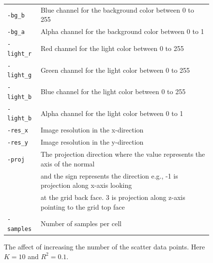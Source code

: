 \documentclass[12pt]{article}
\begin{document}
\begin{figure}[tbh]
\begin{tabular}{ |l| l|}
  \texttt{-bg\_b}  &      Blue channel for the background color between 0 to 255 \\    
  \texttt{-bg\_a}  &      Alpha channel for the background color between 0 to 1 \\      
  \texttt{-light\_r}  &     Red channel for the light color between 0 to 255 \\      
  \texttt{-light\_g}  &     Green channel for the light color between 0 to 255 \\      
  \texttt{-light\_b}  &     Blue channel for the light color between 0 to 255 \\      
  \texttt{-light\_b}  &     Alpha channel for the light color between 0 to 1 \\      
  \texttt{-res\_x}  &       Image resolution in the x-direction \\      
  \texttt{-res\_y}  &       Image resolution in the y-direction \\      
  \texttt{-proj}  &       The projection direction where the value represents the axis of the normal\\  
			         &   and the sign represents the direction e.g., -1 is projection along x-axis looking\\
			         &   at the grid back face. 3 is projection along z-axis pointing to the grid top face\\      
  \texttt{-samples}  &   Number of samples per cell \\      
    
  \hline
\end{tabular} 

   \label{tab:metric}
\end{figure} 
	    
\begin{figure}[!tbh]
\centering        
   \caption{The affect of increasing the number of the scatter data points. Here $K=10$ and $R^{2} = 0.1$.}
   \label{fig:points1}
\end{figure}   
   	    
\end{document}
